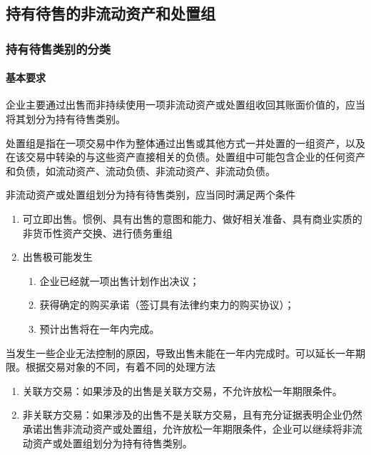 \documentclass[UTF8,12pt]{ctexart}
\numberwithin{equation}{section} %
\numberwithin{figure}{section}
\numberwithin{table}{section}
\begin{document}
	\subsection{持有待售的非流动资产和处置组}
	\subsubsection{持有待售类别的分类}
	\paragraph{基本要求}
	企业主要通过出售而非持续使用一项非流动资产或处置组收回其账面价值的，应当将其划分为持有待售类别。
	
	处置组是指在一项交易中作为整体通过出售或其他方式一并处置的一组资产，以及在该交易中转染的与这些资产直接相关的负债。处置组中可能包含企业的任何资产和负债，如流动资产、流动负债、非流动资产、非流动负债。
	
	非流动资产或处置组划分为持有待售类别，应当同时满足两个条件
	\begin{enumerate}
		\item 可立即出售。惯例、具有出售的意图和能力、做好相关准备、具有商业实质的非货币性资产交换、进行债务重组
		
		\item 出售极可能发生
		\begin{enumerate}
			\item 企业已经就一项出售计划作出决议；
			
			\item 获得确定的购买承诺（签订具有法律约束力的购买协议）；
			
			\item 预计出售将在一年内完成。
		\end{enumerate}
	\end{enumerate}
	
	当发生一些企业无法控制的原因，导致出售未能在一年内完成时。可以延长一年期限。根据交易对象的不同，有着不同的处理方法
	\begin{enumerate}
		\item 关联方交易：如果涉及的出售是关联方交易，不允许放松一年期限条件。
		
		\item 非关联方交易：如果涉及的出售不是关联方交易，且有充分证据表明企业仍然承诺出售非流动资产或处置组，允许放松一年期限条件，企业可以继续将非流动资产或处置组划分为持有待售类别。
	\end{enumerate}
\end{document}
